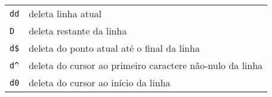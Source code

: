 %
%
%

\begin{table}[htb]\begin{center} \begin{tabular}{ll} \hline
 \verb|dd| & deleta linha atual \\
 \verb|D|  & deleta restante da linha \\
 \verb|d$| & deleta do ponto atual até o final da linha \\
 \verb|d^| & deleta do cursor ao primeiro caractere não-nulo da linha \\
 \verb|d0| & deleta do cursor ao início da linha \\
\hline \end{tabular}\end{center}\end{table}


